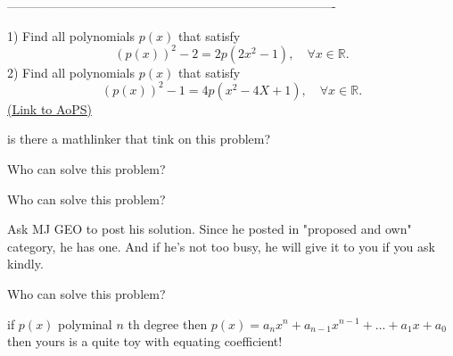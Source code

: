 -------------------------------------------------------------------------------

\begin{problem}
	1) Find all polynomials $p(x)$ that satisfy
\[(p(x))^2-2=2p(2x^2-1), \quad \forall x \in \mathbb R.\]
2) Find all polynomials $p(x)$ that satisfy
\[(p(x))^2-1=4p(x^2-4X+1), \quad \forall x \in \mathbb R.\]
	\flushright \href{https://artofproblemsolving.com/community/c6h316463}{(Link to AoPS)}
\end{problem}



\begin{solution}
	is there a mathlinker that tink on this problem?
\end{solution}



\begin{solution}
	Who can solve this problem?
\end{solution}



\begin{solution}
	\begin{tcolorbox}Who can solve this problem?\end{tcolorbox}

Ask MJ GEO to post his solution. Since he posted in "proposed and own" category, he has one. And if he's not too busy, he will give it to you if you ask kindly.
\end{solution}



\begin{solution}
	\begin{tcolorbox}Who can solve this problem?\end{tcolorbox}  

if $ p(x)$ polyminal $ n$ th degree then $ p(x)=a_nx^n+a_{n-1}x^{n-1}+...+a_1x+a_0$ 
then yours is a quite toy with equating coefficient!
\end{solution}



